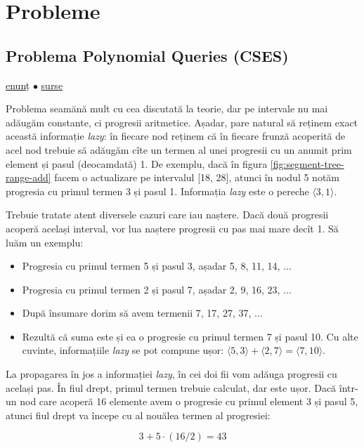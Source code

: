 \documentclass[../main.tex]{subfiles}
\begin{document}
\section{Probleme}

\subsection{Problema Polynomial Queries (CSES)}
\label{problem:polynomial-queries}

\href{https://cses.fi/problemset/task/1736}{enunț}
$\bullet$
\hyperref[code:polynomial-queries]{surse}

Problema seamănă mult cu cea discutată la teorie, dar pe intervale nu mai adăugăm constante, ci progresii aritmetice. Așadar, pare natural să reținem exact această informație \textit{lazy}: în fiecare nod reținem că în fiecare frunză acoperită de acel nod trebuie să adăugăm cîte un termen al unei progresii cu un anumit prim element și pasul (deocamdată) 1. De exemplu, dacă în figura \ref{fig:segment-tree-range-add} facem o actualizare pe intervalul [18, 28], atunci în nodul 5 notăm progresia cu primul termen 3 și pasul 1. Informația \textit{lazy} este o pereche $\langle 3,1 \rangle$.

Trebuie tratate atent diversele cazuri care iau naștere. Dacă două progresii acoperă același interval, vor lua naștere progresii cu pas mai mare decît 1. Să luăm un exemplu:

\begin{itemize}
  \item Progresia cu primul termen 5 și pasul 3, așadar 5, 8, 11, 14, ...
  \item Progresia cu primul termen 2 și pasul 7, așadar 2, 9, 16, 23, ...
  \item După însumare dorim să avem termenii 7, 17, 27, 37, ...
  \item Rezultă că suma este și ea o progresie cu primul termen 7 și pasul 10. Cu alte cuvinte, informațiile \textit{lazy} se pot compune ușor: $\langle 5,3 \rangle + \langle 2,7 \rangle = \langle 7,10 \rangle$.
\end{itemize}

La propagarea în jos a informației \textit{lazy}, în cei doi fii vom adăuga progresii cu același pas. În fiul drept, primul termen trebuie calculat, dar este ușor. Dacă într-un nod care acoperă 16 elemente avem o progresie cu primul element 3 și pasul 5, atunci fiul drept va începe cu al nouălea termen al progresiei:

$$3 + 5 \cdot (16/2) = 43$$
\end{document}

